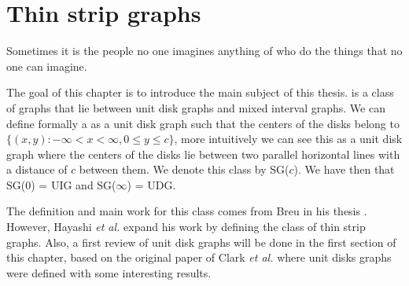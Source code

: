 \chapter{Thin strip graphs}
\label{chap:thinDef}

\begin{fquote}
  Sometimes it is the people no one imagines anything of who do the things that no one can imagine.
\end{fquote}

The goal of this chapter is to introduce the main subject of this thesis. \emph{} is a class of graphs that lie between unit disk graphs
and mixed interval graphs. We can define formally a \emph{} as a unit disk graph such that the centers of the disks belong to $\{(x,y) : -\infty < x < \infty, 0 \leq y \leq c\}$, more intuitively we can see this as a unit disk graph where the centers of the disks lie between two parallel horizontal lines with a distance of $c$ between them. We denote this class by SG($c$). We have then that SG($0$) = UIG and SG($\infty$) = UDG.

The definition and main work for this class comes from Breu in his thesis \cite{breuAlgorithmicAspectsConstrained1996}. However, Hayashi \textit{et al.} \cite{hayashiThinStripGraphs2017} expand his work by defining the class of thin strip graphs. Also, a first review of unit disk graphs will be done in the first section of this chapter, based on the original paper of Clark \textit{et al.} \cite{CLARK1990165} where unit disks graphs were defined with some interesting results.

